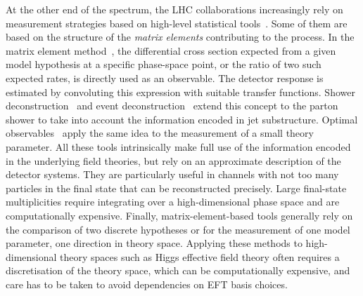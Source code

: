At the other end of the spectrum, the LHC collaborations increasingly
rely on measurement strategies based on high-level statistical
tools~\cite{cranmer:nips2016}. Some of them are based on the structure
of the \emph{matrix elements} contributing to the process. In the
matrix element method~\cite{Kondo:1988yd, Abazov:2004cs, Gao:2010qx,
  Alwall:2010cq, Avery:2012um, Andersen:2012kn, Campbell:2013hz,
  Artoisenet:2013vfa, Martini:2015fsa, Gritsan:2016hjl}, the
differential cross section expected from a given model hypothesis at a
specific phase-space point, or the ratio of two such expected rates,
is directly used as an observable. The detector response is estimated
by convoluting this expression with suitable transfer
functions. Shower deconstruction~\cite{Soper:2011cr, Soper:2012pb} and
event deconstruction~\cite{Soper:2014rya} extend this concept to the
parton shower to take into account the information encoded in jet
substructure. Optimal observables~\cite{Atwood:1991ka, Davier:1992nw,
  Diehl:1993br} apply the same idea to the measurement of a small
theory parameter. All these tools intrinsically make full use of the
information encoded in the underlying field theories, but rely on an
approximate description of the detector systems. They are particularly
useful in channels with not too many particles in the final state that
can be reconstructed precisely. Large final-state multiplicities
require integrating over a high-dimensional phase space and are
computationally expensive. Finally, matrix-element-based tools
generally rely on the comparison of two discrete hypotheses or for the
measurement of one model parameter, \ie one direction in theory
space. Applying these methods to high-dimensional theory spaces such
as Higgs effective field theory often requires a discretisation of the
theory space, which can be computationally expensive, and care has to
be taken to avoid dependencies on EFT basis choices.

